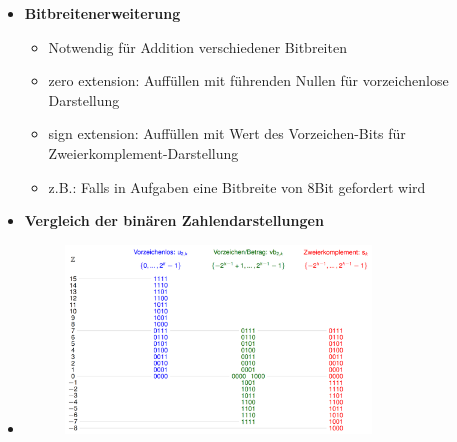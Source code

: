 \documentclass[11pt,a4paper]{article}
\begin{document}
\begin{itemize}
\begin{itemize}
\begin{itemize}
		\end{itemize}
	\end{itemize}
	
	\pagebreak	
	
\item \textbf{Bitbreitenerweiterung}
	\begin{itemize}
	\item Notwendig für Addition verschiedener Bitbreiten
	\item zero extension: Auffüllen mit führenden Nullen für vorzeichenlose Darstellung
	\item sign extension: Auffüllen mit Wert des Vorzeichen-Bits für Zweierkomplement-Darstellung
	\item z.B.: Falls in Aufgaben eine Bitbreite von 8Bit gefordert wird
	\end{itemize}

\item \textbf{Vergleich der binären Zahlendarstellungen}
\item[] \begin{figure}[H]
			\begin{center}
			\includegraphics[height=5cm]{Bilder/compzahlen}
			\end{center}
		\end{figure}

\end{itemize}
\end{document}
